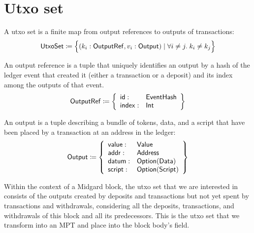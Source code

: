 \documentclass[../midgard.tex]{subfiles}
\begin{document}
\section{Utxo set}
\label{h:utxo-set}

A utxo set is a finite map from output references to outputs of transactions:
\begin{equation*}
    \mathsf{UtxoSet} \coloneq \Bigl\{
        (k_i: \mathsf{OutputRef}, v_i: \mathsf{Output}) \mid \forall i \neq j.\; k_i \neq k_j
    \Bigr\}
\end{equation*}

An output reference is a tuple that uniquely identifies an output by a hash of the ledger event that created it (either a transaction or a deposit) and its index among the outputs of that event.
\begin{equation*}
    \mathsf{OutputRef} \coloneq \left\{
    \begin{array}{ll}
        \mathsf{id} : & \mathsf{EventHash} \\
        \mathsf{index} : & \mathsf{Int}
    \end{array} \right\}
\end{equation*}

An output is a tuple describing a bundle of tokens, data, and a script that have been placed by a transaction at an address in the ledger:
\begin{equation*}
    \mathsf{Output} \coloneq \left\{
    \begin{array}{ll}
        \mathsf{value} : & \mathsf{Value} \\
        \mathsf{addr} : & \mathsf{Address} \\
        \mathsf{datum} : & \mathsf{Option(Data)} \\
        \mathsf{script} : & \mathsf{Option(Script)}
    \end{array} \right\}
\end{equation*}

Within the context of a Midgard block, the utxo set that we are interested in consists of the outputs created by deposits and transactions but not yet spent by transactions and withdrawals, considering all the deposits, transactions, and withdrawals of this block and all its predecessors.
This is the utxo set that we transform into an MPT and place into the block body's  field.


\todo

\todo

\todo
\end{document}
